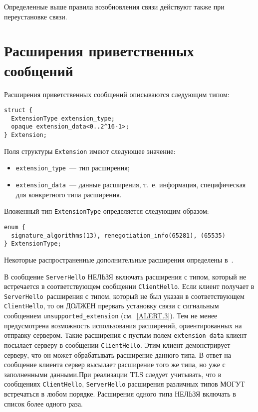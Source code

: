 Определенные выше правила возобновления связи 
действуют также при переустановке связи. 

\section{Расширения приветственных сообщений}\label{HANDSHAKE.7}

Расширения приветственных сообщений описываются следующим типом:
\begin{lstlisting}
struct {
  ExtensionType extension_type;
  opaque extension_data<0..2^16-1>;
} Extension;
\end{lstlisting}

Поля структуры \lstinline{Extension} имеют следующее значение:
\begin{itemize}
\item[--]
\lstinline{extension_type}~--- тип расширения;

\item[--]
\lstinline{extension_data}~--- данные расширения, т.~е. информация, 
специфическая для конкретного типа расширения. 
\end{itemize}

Вложенный тип \lstinline{ExtensionType} определяется следующим образом:
\begin{lstlisting}
enum {
  signature_algorithms(13), renegotiation_info(65281), (65535)
} ExtensionType;
\end{lstlisting}

\begin{note*}
Некоторые распространенные дополнительные расширения определены 
в~\cite{RFC6066}.
\end{note*} 

В сообщение \lstinline{ServerHello} НЕЛЬЗЯ включать расширения с типом,
который не встречается в соответствующем сообщении \lstinline{ClientHello}.
Если клиент получает в \mbox{\lstinline{ServerHello} расширения} с типом, который
не был указан в соответствующем \lstinline{ClientHello}, то он ДОЛЖЕН
прервать установку связи с сигнальным сообщением
\lstinline{unsupported_extension} (см.~\ref{ALERT.3}). Тем не менее
предусмотрена возможность использования расширений, ориентированных на
отправку сервером. Такие расширения с пустым полем
\lstinline{extension_data} клиент посылает серверу в сообщении
\lstinline{ClientHello}. Этим клиент демонстрирует серверу, что он может
обрабатывать расширение данного типа. В ответ на сообщение клиента сервер
высылает расширение того же типа, но уже с заполненными данными.При
реализации TLS следует учитывать, что в сообщениях \lstinline{ClientHello},
\lstinline{ServerHello} расширения различных типов МОГУТ встречаться в
любом порядке. Расширения одного типа НЕЛЬЗЯ включать в список более одного
раза.

